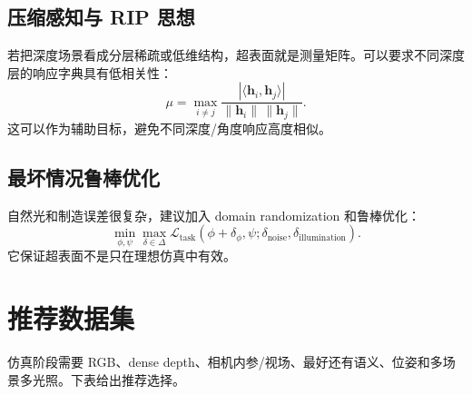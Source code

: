 \documentclass[11pt,a4paper,fontset=none]{ctexart}
\begin{document}
\subsection{压缩感知与 RIP 思想}

若把深度场景看成分层稀疏或低维结构，超表面就是测量矩阵。可以要求不同深度层的响应字典具有低相关性：
\begin{equation}
  \mu =
  \max_{i\neq j}
  \frac{|\langle \bm h_i,\bm h_j\rangle|}
  {\|\bm h_i\|\,\|\bm h_j\|}.
\end{equation}
这可以作为辅助目标，避免不同深度/角度响应高度相似。

\subsection{最坏情况鲁棒优化}

自然光和制造误差很复杂，建议加入 domain randomization 和鲁棒优化：
\begin{equation}
  \min_{\phi,\psi}
  \max_{\delta\in\Delta}
  \mathcal L_{\mathrm{task}}(\phi+\delta_\phi,\psi;\delta_{\mathrm{noise}},\delta_{\mathrm{illumination}}).
\end{equation}
它保证超表面不是只在理想仿真中有效。

\section{推荐数据集}

仿真阶段需要 RGB、dense depth、相机内参/视场、最好还有语义、位姿和多场景多光照。下表给出推荐选择。
\end{document}
